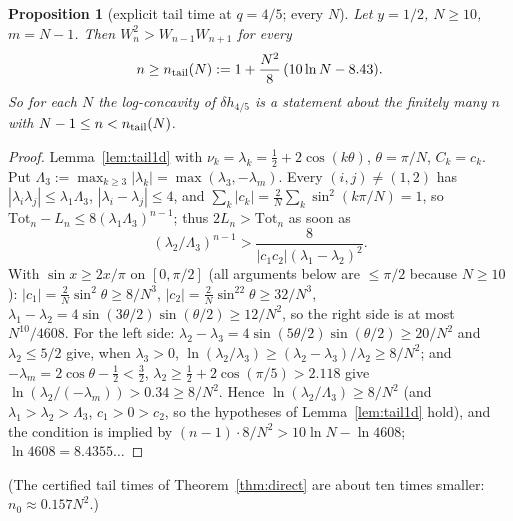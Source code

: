 \documentclass[11pt,a4paper]{article}
\newtheorem{proposition}[theorem]{Proposition}
\theoremstyle{definition}
\begin{document}
\begin{proposition}[explicit tail time at $q=4/5$; every $N$]\label{prop:ntail}
Let $y=1/2$, $N\ge10$, $m=N-1$. Then $W_n^2>W_{n-1}W_{n+1}$ for every
\[
n\ge n_{\rm tail}(N):=1+\frac{N^2}8\,(10\ln N-8.43).
\]
So for each $N$ the log-concavity of $\delta h_{4/5}$ is a statement about the finitely many $n$ with $N-1\le n<n_{\rm tail}(N)$.
\end{proposition}
\begin{proof}
Lemma~\ref{lem:tail1d} with $\nu_k=\lambda_k=\frac12+2\cos(k\theta)$, $\theta=\pi/N$, $C_k=c_k$. Put $\Lambda_3:=\max_{k\ge3}|\lambda_k|=\max(\lambda_3,-\lambda_m)$. Every $(i,j)\ne(1,2)$ has $|\lambda_i\lambda_j|\le\lambda_1\Lambda_3$, $|\lambda_i-\lambda_j|\le4$, and $\sum_k|c_k|=\frac2N\sum_k\sin^2(k\pi/N)=1$, so $\mathrm{Tot}_n-L_n\le8(\lambda_1\Lambda_3)^{n-1}$; thus $2L_n>\mathrm{Tot}_n$ as soon as
\[
(\lambda_2/\Lambda_3)^{n-1}>\frac8{|c_1c_2|(\lambda_1-\lambda_2)^2}.
\]
With $\sin x\ge2x/\pi$ on $[0,\pi/2]$ (all arguments below are $\le\pi/2$ because $N\ge10$): $|c_1|=\frac2N\sin^2\theta\ge8/N^3$, $|c_2|=\frac2N\sin^22\theta\ge32/N^3$, $\lambda_1-\lambda_2=4\sin(3\theta/2)\sin(\theta/2)\ge12/N^2$, so the right side is at most $N^{10}/4608$. For the left side: $\lambda_2-\lambda_3=4\sin(5\theta/2)\sin(\theta/2)\ge20/N^2$ and $\lambda_2\le5/2$ give, when $\lambda_3>0$, $\ln(\lambda_2/\lambda_3)\ge(\lambda_2-\lambda_3)/\lambda_2\ge8/N^2$; and $-\lambda_m=2\cos\theta-\frac12<\frac32$, $\lambda_2\ge\frac12+2\cos(\pi/5)>2.118$ give $\ln(\lambda_2/(-\lambda_m))>0.34\ge8/N^2$. Hence $\ln(\lambda_2/\Lambda_3)\ge8/N^2$ (and $\lambda_1>\lambda_2>\Lambda_3$, $c_1>0>c_2$, so the hypotheses of Lemma~\ref{lem:tail1d} hold), and the condition is implied by $(n-1)\cdot8/N^2>10\ln N-\ln4608$; $\ln4608=8.4355\ldots$
\end{proof}
(The certified tail times of Theorem~\ref{thm:direct} are about ten times smaller: $n_0\approx0.157N^2$.)
\end{document}
